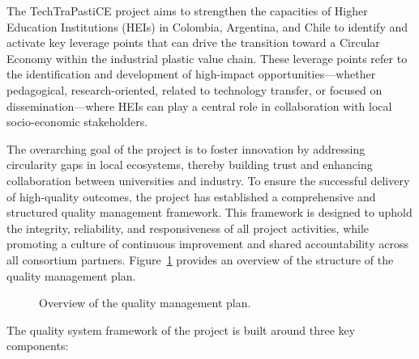 \documentclass[
  12pt,
  oneside]{book}
\begin{document}
The TechTraPastiCE project aims to strengthen the capacities of Higher
Education Institutions (HEIs) in Colombia, Argentina, and Chile to
identify and activate key leverage points that can drive the transition
toward a Circular Economy within the industrial plastic value chain.
These leverage points refer to the identification and development of
high-impact opportunities---whether pedagogical, research-oriented,
related to technology transfer, or focused on dissemination---where HEIs
can play a central role in collaboration with local socio-economic
stakeholders.

The overarching goal of the project is to foster innovation by
addressing circularity gaps in local ecosystems, thereby building trust
and enhancing collaboration between universities and industry. To ensure
the successful delivery of high-quality outcomes, the project has
established a comprehensive and structured quality management framework.
This framework is designed to uphold the integrity, reliability, and
responsiveness of all project activities, while promoting a culture of
continuous improvement and shared accountability across all consortium
partners. Figure~\ref{fig-qmp} provides an overview of the structure of
the quality management plan.

\begin{figure}[H]


\caption{\label{fig-qmp}Overview of the quality management plan.}

\end{figure}%

The quality system framework of the project is built around three key
components:
\end{document}
